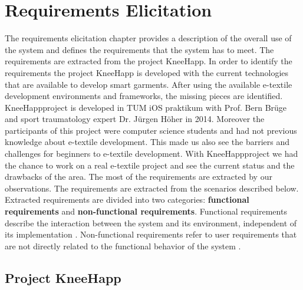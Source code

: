 \def\kneehapp {KneeHapp}


\chapter{Requirements Elicitation}
	
	The requirements elicitation chapter provides a description of the overall use of the system and defines the requirements that the system has to meet. The requirements are extracted from the project \kneehapp. In order to identify the requirements the project KneeHapp is developed with the current technologies that are available to develop smart garments. After using the available e-textile development environments and frameworks, the missing pieces are identified.  \kneehapp  project is developed in TUM iOS praktikum with Prof. Bern Br\"uge and sport traumatology expert Dr. J\"urgen H\"oher in 2014. Moreover the participants of this project were computer science students and had not previous knowledge about e-textile development. This made us also see the barriers and challenges for beginners to e-textile development. With \kneehapp project we had the chance to work on a real e-textile project and see the current status and the drawbacks of the area. The most of the requirements are extracted by our observations. The requirements are extracted from the scenarios described below. Extracted requirements are divided into two categories: \textbf{functional requirements} and \textbf{non-functional requirements}. Functional requirements describe the interaction between the system and its environment, independent of its implementation \cite{Bruegge2004}. Non-functional requirements refer to user requirements that are not directly related to the functional behavior of the system \cite{Bruegge2004}.

	
\section{Project \kneehapp}

